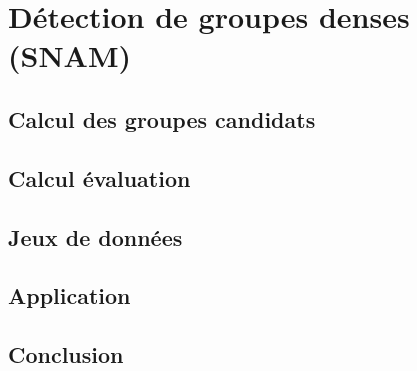 \chapter{Détection de groupes denses (SNAM)}
\minitoc


\section{Calcul des groupes candidats}

\section{Calcul évaluation}

\section{Jeux de données}

\section{Application}

\section{Conclusion}